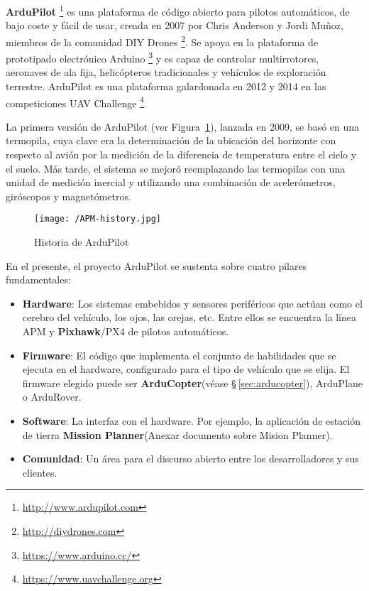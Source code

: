 \textbf{ArduPilot} \footnote{\url{http://www.ardupilot.com}} es una plataforma de código abierto para pilotos automáticos, de bajo coste y fácil de usar, creada en 2007 por Chris Anderson y Jordi Muñoz, miembros de la comunidad DIY Drones \footnote{\url{http://diydrones.com}}. Se apoya en la plataforma de prototipado electrónico Arduino \footnote{\url{https://www.arduino.cc/}} y es capaz de controlar multirrotores, aeronaves de ala fija, helicópteros tradicionales y vehículos de exploración terrestre. ArduPilot es una plataforma galardonada en 2012 y 2014 en las competiciones UAV Challenge \footnote{\url{https://www.uavchallenge.org}}.

La primera versión de ArduPilot (ver Figura~\ref{fig:APMHistory}), lanzada en 2009, se basó en una termopila, cuya clave era la determinación de la ubicación del horizonte con respecto al avión por la medición de la diferencia de temperatura entre el cielo y el suelo. Más tarde, el sistema se mejoró reemplazando las termopilas con una unidad de medición inercial y utilizando una combinación de acelerómetros, giróscopos y magnetómetros.

\begin{figure}[!h]
\begin{center}
\texttt{[image: /APM-history.jpg]}
\caption[Historia de ArduPilot]{Historia de ArduPilot \footnotemark}
\label{fig:APMHistory}
\end{center}
\end{figure}


En el presente, el proyecto ArduPilot se sustenta sobre cuatro pilares fundamentales:

\begin{itemize}
\item \textbf{Hardware}: Los sistemas embebidos y sensores periféricos que actúan como el cerebro del vehículo, los ojos, las orejas, etc. Entre ellos se encuentra la línea APM y \textbf{Pixhawk}/PX4 de pilotos automáticos.
\item \textbf{Firmware}: El código que implementa el conjunto de habilidades que se ejecuta en el hardware, configurado para el 
tipo de vehículo que se elija. El firmware elegido puede ser \textbf{ArduCopter}(véase \S\,\ref{sec:arducopter}), ArduPlane o ArduRover.
\item \textbf{Software}: La interfaz con el hardware. Por ejemplo, la aplicación de estación de tierra \textbf{Mission Planner}(Anexar documento sobre Mision Planner).
\item \textbf{Comunidad}: Un área para el discurso abierto entre los desarrolladores y sus clientes.
\end{itemize}

